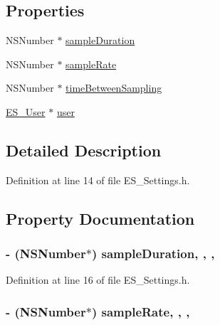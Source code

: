 \subsection*{Properties}
\begin{DoxyCompactItemize}
\item 
N\+S\+Number $\ast$ \hyperlink{interface_e_s___settings_a77cd924c63610290e1d4888cdb0634e7}{sample\+Duration}
\item 
N\+S\+Number $\ast$ \hyperlink{interface_e_s___settings_ad9eafb8ad1f1dedc53e39f84ee73aecf}{sample\+Rate}
\item 
N\+S\+Number $\ast$ \hyperlink{interface_e_s___settings_a633234642f53c068c10772edd5e61cc1}{time\+Between\+Sampling}
\item 
\hyperlink{interface_e_s___user}{E\+S\+\_\+\+User} $\ast$ \hyperlink{interface_e_s___settings_a337f820d30530c3423390ac4f57feca6}{user}
\end{DoxyCompactItemize}


\subsection{Detailed Description}


Definition at line 14 of file E\+S\+\_\+\+Settings.\+h.



\subsection{Property Documentation}
\hypertarget{interface_e_s___settings_a77cd924c63610290e1d4888cdb0634e7}{
\subsubsection[{sample\+Duration}]{\setlength{\rightskip}{0pt plus 5cm}-\/ (N\+S\+Number$\ast$) sample\+Duration\hspace{0.3cm}{\ttfamily [read]}, {\ttfamily [write]}, {\ttfamily [nonatomic]}, {\ttfamily [retain]}}}\label{interface_e_s___settings_a77cd924c63610290e1d4888cdb0634e7}


Definition at line 16 of file E\+S\+\_\+\+Settings.\+h.

\hypertarget{interface_e_s___settings_ad9eafb8ad1f1dedc53e39f84ee73aecf}{
\subsubsection[{sample\+Rate}]{\setlength{\rightskip}{0pt plus 5cm}-\/ (N\+S\+Number$\ast$) sample\+Rate\hspace{0.3cm}{\ttfamily [read]}, {\ttfamily [write]}, {\ttfamily [nonatomic]}, {\ttfamily [retain]}}}\label{interface_e_s___settings_ad9eafb8ad1f1dedc53e39f84ee73aecf}


